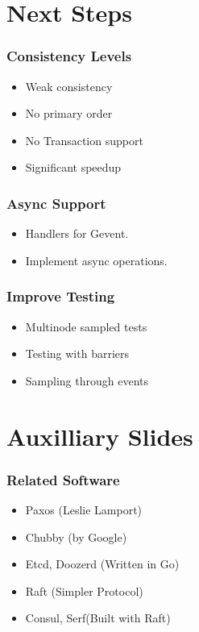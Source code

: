 \documentclass[10pt, compress]{beamer}
\begin{document}
\section{Next Steps}
\begin{frame}[fragile]
    \frametitle{Consistency Levels}
    \begin{itemize}
        \item Weak consistency
        \item No primary order
        \item No Transaction support
        \item Significant speedup
    \end{itemize}
\end{frame}

\begin{frame}
    \frametitle{Async Support}
    \begin{itemize}
        \item Handlers for Gevent.
        \item Implement async operations.
    \end{itemize}

\end{frame}

\begin{frame}
    \frametitle{Improve Testing}
    \begin{itemize}
        \item Multinode sampled tests
        \item Testing with barriers
        \item Sampling through events
    \end{itemize}
\end{frame}


\section{Auxilliary Slides}

\begin{frame}
    \frametitle{Related Software}
    \begin{itemize}
        \item Paxos (Leslie Lamport)
        \item Chubby (by Google)
        \item Etcd, Doozerd (Written in Go)
        \item Raft (Simpler Protocol)
        \item Consul, Serf(Built with Raft)
    \end{itemize}
\end{frame}
\end{document}
